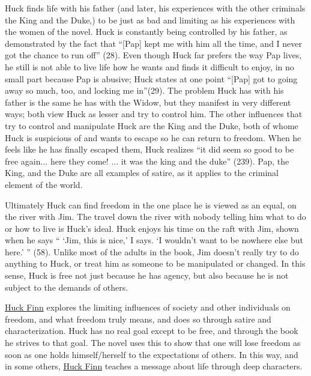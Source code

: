 \documentclass[12pt]{article}
\begin{document}
	Huck finds life with his father (and later, his experiences with the other criminals the King and the Duke,) to be just as bad and limiting as his experiences with the women of the novel.  Huck is constantly being controlled by his father, as demonstrated by the fact that ``[Pap] kept me with him all the time, and I never got the chance to run off'' (28).  Even though Huck far prefers the way Pap lives, he still is not able to live life how he wants and finds it difficult to enjoy, in no small part because Pap is abusive; Huck states at one point ``[Pap] got to going away so much, too, and locking me in''(29).  The problem Huck has with his father is the same he has with the Widow, but they manifest in very different ways; both view Huck as lesser and try to control him.  The other influences that try to control and manipulate Huck are the King and the Duke, both of whome Huck is suspicious of and wants to escape so he can return to freedom.  When he feels like he has finally escaped them, Huck realizes ``it did seem so good to be free again... here they come! ... it was the king and the duke'' (239).  Pap, the King, and the Duke are all examples of satire, as it applies to the criminal element of the world.

	Ultimately Huck can find freedom in the one place he is viewed as an equal, on the river with Jim.  The travel down the river with nobody telling him what to do or how to live is Huck's ideal.  Huck enjoys his time on the raft with Jim, shown when he says `` `Jim, this is nice,' I says. `I wouldn't want to be nowhere else but here.' '' (58).  Unlike most of the adults in the book, Jim doesn't really try to do anything to Huck, or treat him as someone to be manipulated or changed.  In this sense, Huck is free not just because he has agency, but also because he is not subject to the demands of others.

	\underline{Huck Finn} explores the limiting influences of society and other individuals on freedom, and what freedom truly means, and does so through satire and characterization.  Huck has no real goal except to be free, and through the book he strives to that goal.  The novel uses this to show that one will lose freedom as soon as one holds himself/herself to the expectations of others.  In this way, and in some others, \underline{Huck Finn} teaches a message about life through deep characters.
\end{document}
